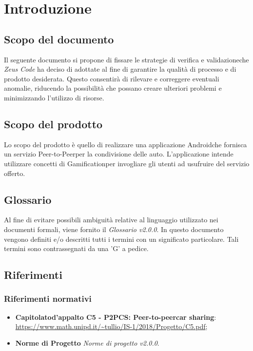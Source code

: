 \section{Introduzione}
\subsection{Scopo del documento}
Il seguente documento si propone di fissare le strategie di verifica e validazione\glosp che \textit{Zeus Code} ha deciso di adottate al fine di garantire la qualità di processo e di prodotto desiderata. \newline
Questo consentirà di rilevare e correggere eventuali anomalie, riducendo la possibilità che possano creare ulteriori problemi e minimizzando l'utilizzo di risorse. 
\subsection{Scopo del prodotto}
Lo scopo del prodotto è quello di realizzare una applicazione Android\glosp che fornisca un servizio Peer-to-Peer\glosp per la condivisione delle auto. L'applicazione intende utilizzare concetti di Gamification\glosp per invogliare gli utenti ad usufruire del servizio offerto.
\subsection{Glossario}
Al fine di evitare possibili ambiguità relative al linguaggio utilizzato nei documenti formali, viene fornito il \textit{Glossario v2.0.0}. In questo documento vengono definiti e/o descritti tutti i termini con un significato particolare. Tali termini sono contrassegnati da una 'G' a pedice.
\subsection{Riferimenti}
\subsubsection{Riferimenti normativi}
\begin{itemize}

\item \textbf{Capitolato\glosp d'appalto C5 - P2PCS: Peer-to-peer\glosp car sharing}: \\ \url{https://www.math.unipd.it/~tullio/IS-1/2018/Progetto/C5.pdf};
\item \textbf{Norme di Progetto} \textit{Norme di progetto v2.0.0}.
\end{itemize}

